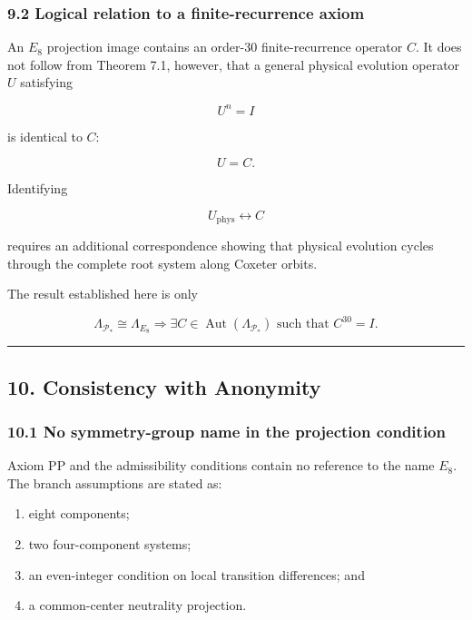 \documentclass[
  a4paper,
]{article}
\providecommand{\tightlist}{%
  \setlength{\itemsep}{0pt}\setlength{\parskip}{0pt}}
\begin{document}
\subsubsection{9.2 Logical relation to a finite-recurrence
axiom}\label{logical-relation-to-a-finite-recurrence-axiom}

An \(E_8\) projection image contains an order-30 finite-recurrence
operator \(C\). It does not follow from Theorem 7.1, however, that a
general physical evolution operator \(U\) satisfying

\[
U^n=I
\]

is identical to \(C\):

\[
U=C.
\]

Identifying

\[
U_{\mathrm{phys}}
\longleftrightarrow
C
\]

requires an additional correspondence showing that physical evolution
cycles through the complete root system along Coxeter orbits.

The result established here is only

\[
\boxed{
\Lambda_{\mathcal P_*}
\cong
\Lambda_{E_8}
\Longrightarrow
\exists C\in\operatorname{Aut}(\Lambda_{\mathcal P_*})
\text{ such that }
C^{30}=I.
}
\]

\begin{center}\rule{0.5\linewidth}{0.5pt}\end{center}

\subsection{10. Consistency with
Anonymity}\label{consistency-with-anonymity}

\subsubsection{10.1 No symmetry-group name in the projection
condition}\label{no-symmetry-group-name-in-the-projection-condition}

Axiom PP and the admissibility conditions contain no reference to the
name \(E_8\). The branch assumptions are stated as:

\begin{enumerate}
\def\labelenumi{\arabic{enumi}.}
\tightlist
\item
  eight components;
\item
  two four-component systems;
\item
  an even-integer condition on local transition differences; and
\item
  a common-center neutrality projection.
\end{enumerate}
\end{document}
